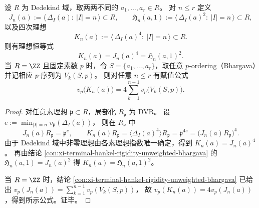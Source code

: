 \begin{proposition}\label{prop:xi-unweighted-rigidity-quartic-ideal-pordering}
设 \(R\) 为 Dedekind 域，取两两不同的 \(a_1,\dots,a_r\in R\)。
对 \(n\le r\) 定义
\[
J_n(a):=\big\langle\,\Delta_I(a):\ |I|=n\,\big\rangle\subset R,
\qquad
\mathfrak H_n(a,1):=\big\langle\,\Delta_I(a)^2:\ |I|=n\,\big\rangle\subset R,
\]
以及四次理想
\[
K_n(a):=\big\langle\,\Delta_I(a)^4:\ |I|=n\,\big\rangle\subset R.
\]
则有理想恒等式
\[
\boxed{\;K_n(a)=J_n(a)^4=\mathfrak H_n(a,1)^2.\;}
\]
当 \(R=\ZZ\) 且固定素数 \(p\) 时，令 \(S=\{a_1,\dots,a_r\}\)，取任意 \(p\)-ordering（Bhargava）并记相应 \(p\)-序列为 \(V_k(S,p)\)。
则对任意 \(n\le r\) 有赋值公式
\[
v_p\!\bigl(K_n(a)\bigr)=4\sum_{k=1}^{n-1} v_p\!\bigl(V_k(S,p)\bigr).
\]
\end{proposition}
\begin{proof}
对任意素理想 \(\mathfrak p\subset R\)，局部化 \(R_{\mathfrak p}\) 为 DVR。
设
\(
e:=\min_{|I|=n} v_{\mathfrak p}(\Delta_I(a))
\)，
则在 \(R_{\mathfrak p}\) 中
\[
J_n(a)R_{\mathfrak p}=\mathfrak p^{e},
\qquad
K_n(a)R_{\mathfrak p}=\langle \Delta_I(a)^4\rangle R_{\mathfrak p}=\mathfrak p^{4e}=\bigl(J_n(a)R_{\mathfrak p}\bigr)^4.
\]
由于 Dedekind 域中非零理想由各素理想指数唯一确定，得到 \(K_n(a)=J_n(a)^4\)。
再由结论 \ref{con:xi-terminal-hankel-rigidity-unweighted-bhargava} 的 \(\mathfrak H_n(a,1)=J_n(a)^2\) 得 \(K_n(a)=\mathfrak H_n(a,1)^2\)。
\par
当 \(R=\ZZ\) 时，结论 \ref{con:xi-terminal-hankel-rigidity-unweighted-bhargava} 已给出
\(
v_p(J_n(a))=\sum_{k=1}^{n-1}v_p(V_k(S,p))
\)，
故 \(v_p(K_n(a))=4v_p(J_n(a))\)，得到所示公式。证毕。
\end{proof}

